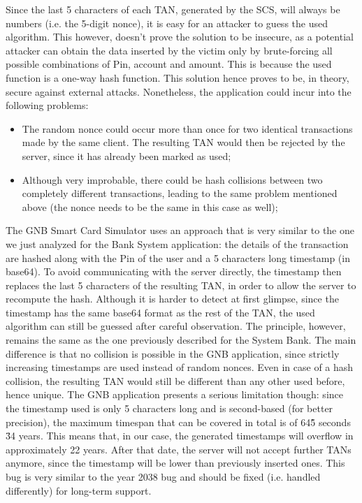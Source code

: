 Since the last 5 characters of each TAN, generated by the SCS, will always be numbers (i.e. the 5-digit nonce), it is easy for an attacker to guess the used algorithm. This however, doesn't prove the solution to be insecure, as a potential attacker can obtain the data inserted by the victim only by brute-forcing all possible combinations of Pin, account and amount. This is because the used function is a one-way hash function.\newline
This solution hence proves to be, in theory, secure against external attacks. Nonetheless, the application could incur into the following problems:
\begin{itemize}
	\item The random nonce could occur more than once for two identical transactions made by the same client. The resulting TAN would then be rejected by the server, since it has already been marked as used;
	\item Although very improbable, there could be hash collisions between two completely different transactions, leading to the same problem mentioned above (the nonce needs to be the same in this case as well);
\end{itemize}
The GNB Smart Card Simulator uses an approach that is very similar to the one we just analyzed for the Bank System application: the details of the transaction are hashed along with the Pin of the user and a 5 characters long timestamp (in base64). To avoid communicating with the server directly, the timestamp then replaces the last 5 characters of the resulting TAN, in order to allow the server to recompute the hash. Although it is harder to detect at first glimpse, since the timestamp has the same base64 format as the rest of the TAN, the used algorithm can still be guessed after careful observation. The principle, however, remains the same as the one previously described for the System Bank. The main difference is that no collision is possible in the GNB application, since strictly increasing timestamps are used instead of random nonces. Even in case of a hash collision, the resulting TAN would still be different than any other used before, hence unique.\newline
The GNB application presents a serious limitation though: since the timestamp used is only 5 characters long and is second-based (for better precision), the maximum timespan that can be covered in total is of 64\^5 seconds \= 34 years. This means that, in our case, the generated timestamps will overflow in approximately 22 years. After that date, the server will not accept further TANs anymore, since the timestamp will be lower than previously inserted ones. This bug is very similar to the year 2038 bug and should be fixed (i.e. handled differently) for long-term support.
